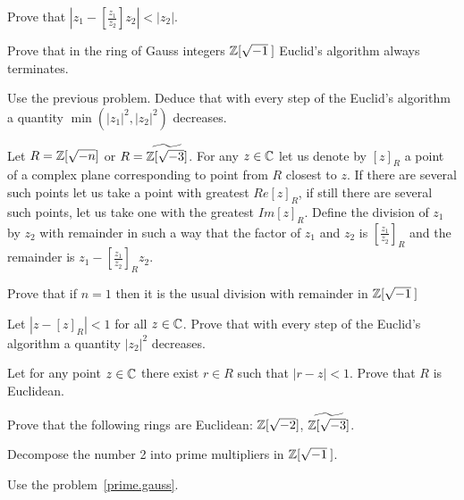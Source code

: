 \documentclass[12pt]{article}
\begin{document}
\begin{zadacha}
Prove that $\left|z_1 - \left[\frac {z_1}{z_2}\right]z_2\right| <
|z_2|$.
\end{zadacha}

\begin{zadacha} 
Prove that in the ring of Gauss integers ${\mathbb Z}[\sqrt{-1}\:]$ Euclid's algorithm
always terminates.
\end{zadacha}

\begin{ukazanie} Use the previous problem.
Deduce that with every step of the Euclid's algorithm a quantity
$\min(|z_1|^2, |z_2|^2)$ decreases.
\end{ukazanie}

Let $R={\mathbb Z}[\sqrt{-n}]$ or $R=\widetilde{{\mathbb Z}[\sqrt{-3}]}$. For any $z\in
{\mathbb C}$ let us denote by $[z]_R$ a point of a complex plane corresponding
to point from $R$ closest to $z$. If there are several such points let
us take a point with greatest $Re [z]_R$, if still there are several
such points, let us take one with the greatest $Im [z]_R$. Define the
division of  $z_1$ by $z_2$ with remainder in such a way that the
factor of $z_1$ and $z_2$ is $[\frac{z_1}{z_2}]_R$ and the remainder
is  $z_1 - [\frac {z_1}{z_2}]_Rz_2$.

\begin{zadacha}[*] Prove that if 
$n=1$ then it is the usual division with remainder in ${\mathbb Z}[\sqrt{-1}\:]$
\end{zadacha}

\begin{zadacha}[*] 
Let  $\left|z - [z]_R\right|<1$ for all $z\in {\mathbb C}$. Prove that with
every step of the Euclid's algorithm a quantity 
$|z_2|^2$ decreases.
\end{zadacha}

\begin{zadacha}[*] 
Let for any point $z\in {\mathbb C}$ there exist $r\in R$ such that
$|r-z|<1$. Prove that $R$ is Euclidean.
\end{zadacha}

\begin{zadacha}[*] 
Prove that the following rings are Euclidean: ${\mathbb Z}[\sqrt{-2}]$,
$\widetilde{{\mathbb Z}[\sqrt{-3}]}$.
\end{zadacha}

\begin{zadacha} Decompose the number 2 into prime multipliers in
${\mathbb Z}[\sqrt{-1}\:]$.
\end{zadacha}

\begin{ukazanie} Use the problem~\ref{prime.gauss}.
\end{ukazanie}
\end{document}
